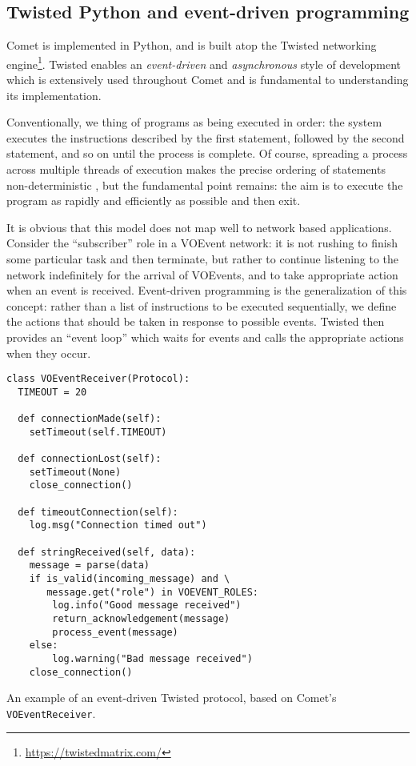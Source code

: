 \documentclass[5p,authoryear]{elsarticle}
\begin{document}
\subsection{Twisted Python and event-driven programming}
\label{sec:design:twisted}

Comet is implemented in Python, and is built atop the Twisted networking
engine\footnote{\url{https://twistedmatrix.com/}}. Twisted enables an
\textit{event-driven} and \textit{asynchronous} style of development which is
extensively used throughout Comet and is fundamental to understanding its
implementation.

Conventionally, we thing of programs as being executed in order: the system
executes the instructions described by the first statement, followed by the
second statement, and so on until the process is complete. Of course,
spreading a process across multiple threads of execution makes the precise
ordering of statements non-deterministic \citep[and, indeed, introduces a whole
new level of complexity in the process;][]{Lee:2006}, but the fundamental
point remains: the aim is to execute the program as rapidly and efficiently as
possible and then exit.

It is obvious that this model does not map well to network based applications.
Consider the ``subscriber'' role in a VOEvent network: it is not rushing to
finish some particular task and then terminate, but rather to continue
listening to the network indefinitely for the arrival of VOEvents, and to
take appropriate action when an event is received. Event-driven programming is
the generalization of this concept: rather than a list of instructions to be
executed sequentially, we define the actions that should be taken in response
to possible events. Twisted then provides an ``event loop'' which waits for
events and calls the appropriate actions when they occur.

\begin{listing}[H]
\begin{verbatim}
class VOEventReceiver(Protocol):
  TIMEOUT = 20

  def connectionMade(self):
    setTimeout(self.TIMEOUT)

  def connectionLost(self):
    setTimeout(None)
    close_connection()

  def timeoutConnection(self):
    log.msg("Connection timed out")

  def stringReceived(self, data):
    message = parse(data)
    if is_valid(incoming_message) and \
       message.get("role") in VOEVENT_ROLES:
        log.info("Good message received")
        return_acknowledgement(message)
        process_event(message)
    else:
        log.warning("Bad message received")
    close_connection()
\end{verbatim}
\caption{An example of an event-driven Twisted protocol, based on Comet's
\texttt{VOEventReceiver}.}
\label{lst:event}
\end{listing}
\end{document}
